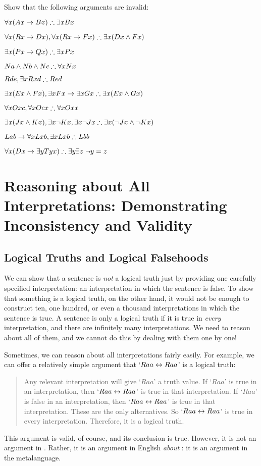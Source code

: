 \problempart
Show that the following arguments are invalid:
\begin{earg}
\item $\forall x(Ax \rightarrow Bx) \mathrel{\therefore} \exists x Bx$
\item $\forall x(Rx \rightarrow Dx), \forall x(Rx \rightarrow Fx) \mathrel{\therefore} \exists x(Dx \wedge Fx)$
\item $\exists x(Px\rightarrow Qx) \mathrel{\therefore} \exists x Px$
\item $Na \wedge Nb \wedge Nc \mathrel{\therefore} \forall x Nx$
\item $Rde, \exists x Rxd \mathrel{\therefore} Red$
\item $\exists x(Ex \wedge Fx), \exists x Fx \rightarrow \exists x Gx \mathrel{\therefore} \exists x(Ex \wedge Gx)$
\item $\forall x Oxc, \forall x Ocx \mathrel{\therefore} \forall x Oxx$
\item $\exists x(Jx \wedge Kx), \exists x \neg Kx, \exists x \neg Jx \mathrel{\therefore} \exists x(\neg Jx \wedge \neg Kx)$
\item $Lab \rightarrow \forall x Lxb, \exists x Lxb \mathrel{\therefore} Lbb$
\item $\forall x(Dx \rightarrow \exists y Tyx) \mathrel{\therefore} \exists y \exists z\ \neg y= z$
\end{earg}

\chapter[Reasoning about All Interpretations]{Reasoning about All Interpretations: Demonstrating Inconsistency and Validity}\label{s:All.Interp}

\section{Logical Truths and Logical Falsehoods}
We can show that a sentence is \emph{not} a logical truth just by providing one carefully specified interpretation: an interpretation in which the sentence is false. To show that something is a logical truth, on the other hand, it would not be enough to construct ten, one hundred, or even a thousand interpretations in which the sentence is true. A sentence is only a logical truth if it is true in \emph{every} interpretation, and there are infinitely many interpretations. We need to reason about all of them, and we cannot do this by dealing with them one by one!

Sometimes, we can reason about all interpretations fairly easily. For example, we can offer a relatively simple argument that `$Raa\leftrightarrow Raa$' is a logical truth:
	\begin{quote}
		\label{allmodels1}
		Any relevant interpretation will give `$Raa$' a truth value. If `$Raa$' is true in an interpretation, then `$Raa \leftrightarrow Raa$' is true in that interpretation. If `$Raa$' is false in an interpretation, then `$Raa \leftrightarrow Raa$' is true in that interpretation. These are the only alternatives. So `$Raa \leftrightarrow Raa$' is true in every interpretation. Therefore, it is a logical truth.
	\end{quote}
This argument is valid, of course, and its conclusion is true. However, it is not an argument in \FOL. Rather, it is an argument in English \emph{about} \FOL: it is an argument in the metalanguage. 

